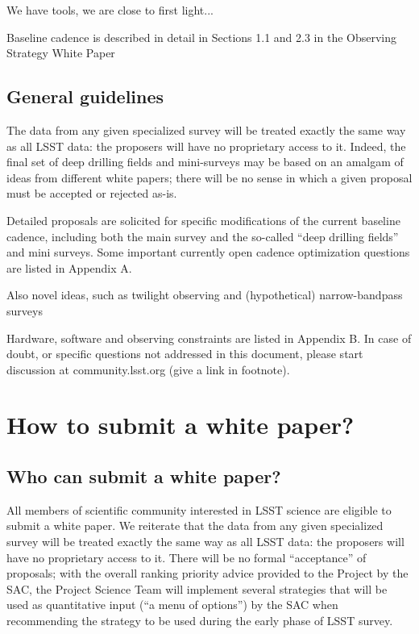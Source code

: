 \documentclass[DM,lsstdraft,toc,usenatbib]{lsstdoc}
\begin{document}
We have tools, we are close to first light... 

Baseline cadence is described in detail in Sections 1.1 and 2.3 in the Observing Strategy White Paper 


\subsection{General guidelines} 

The data from any given specialized survey will be treated exactly the same way as all LSST 
data: the proposers will have no proprietary access to it.  Indeed, the final set of deep
drilling fields and mini-surveys may be based on an amalgam of ideas from different white 
papers; there will be no sense in which a given proposal must be accepted or rejected as-is.  


Detailed proposals are solicited for specific modifications of the current baseline cadence, 
including both the main survey and the so-called ``deep drilling fields'' and mini surveys. 
Some important currently open cadence optimization questions are listed in Appendix A. 

Also novel ideas, such as twilight observing and (hypothetical) narrow-bandpass surveys 


Hardware, software and observing constraints are listed in Appendix B. In case of doubt,
or specific questions not addressed in this document, please start discussion at 
community.lsst.org (give a link in footnote). 


\section{How to submit a white paper?} 


\subsection{Who can submit a white paper?} 

All members of scientific community interested in LSST science are eligible to 
submit a white paper. We reiterate that the data from any given specialized survey 
will be treated exactly the same way as all LSST data: the proposers will have no 
proprietary access to it. There will be no formal ``acceptance'' of proposals; with
the overall ranking priority advice provided to the Project by the SAC, the Project
Science Team will implement several strategies that will be used as quantitative
input (``a menu of options'') by the SAC when recommending the strategy to be
used during the early phase of LSST survey. 
\end{document}
